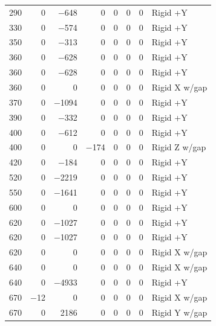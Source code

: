 \begin{longtable}{lrrrrrrl}
    290 & \num{0} & \num{-648} & \num{0} & \num{0} & \num{0} & \num{0} & Rigid +Y \\
    330 & \num{0} & \num{-574} & \num{0} & \num{0} & \num{0} & \num{0} & Rigid +Y \\
    350 & \num{0} & \num{-313} & \num{0} & \num{0} & \num{0} & \num{0} & Rigid +Y \\
    360 & \num{0} & \num{-628} & \num{0} & \num{0} & \num{0} & \num{0} & Rigid +Y \\
    360 & \num{0} & \num{-628} & \num{0} & \num{0} & \num{0} & \num{0} & Rigid +Y \\
    360 & \num{0} & \num{0} & \num{0} & \num{0} & \num{0} & \num{0} & Rigid X w/gap \\
    370 & \num{0} & \num{-1094} & \num{0} & \num{0} & \num{0} & \num{0} & Rigid +Y \\
    390 & \num{0} & \num{-332} & \num{0} & \num{0} & \num{0} & \num{0} & Rigid +Y \\
    400 & \num{0} & \num{-612} & \num{0} & \num{0} & \num{0} & \num{0} & Rigid +Y \\
    400 & \num{0} & \num{0} & \num{-174} & \num{0} & \num{0} & \num{0} & Rigid Z w/gap \\
    420 & \num{0} & \num{-184} & \num{0} & \num{0} & \num{0} & \num{0} & Rigid +Y \\
    520 & \num{0} & \num{-2219} & \num{0} & \num{0} & \num{0} & \num{0} & Rigid +Y \\
    550 & \num{0} & \num{-1641} & \num{0} & \num{0} & \num{0} & \num{0} & Rigid +Y \\
    600 & \num{0} & \num{0} & \num{0} & \num{0} & \num{0} & \num{0} & Rigid +Y \\
    620 & \num{0} & \num{-1027} & \num{0} & \num{0} & \num{0} & \num{0} & Rigid +Y \\
    620 & \num{0} & \num{-1027} & \num{0} & \num{0} & \num{0} & \num{0} & Rigid +Y \\
    620 & \num{0} & \num{0} & \num{0} & \num{0} & \num{0} & \num{0} & Rigid X w/gap \\
    640 & \num{0} & \num{0} & \num{0} & \num{0} & \num{0} & \num{0} & Rigid X w/gap \\
    640 & \num{0} & \num{-4933} & \num{0} & \num{0} & \num{0} & \num{0} & Rigid +Y \\
    670 & \num{-12} & \num{0} & \num{0} & \num{0} & \num{0} & \num{0} & Rigid X w/gap \\
    670 & \num{0} & \num{2186} & \num{0} & \num{0} & \num{0} & \num{0} & Rigid Y w/gap \\

\end{longtable}
